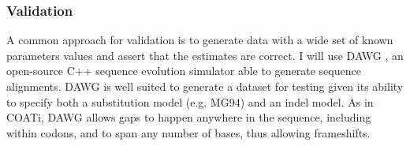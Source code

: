 



\subsubsection{Validation}

A common approach for validation is to generate data with a wide set of known
parameters values and assert that the estimates are correct.
I will use DAWG \parencite{cartwright2005dawg}, an open-source C++ sequence
evolution simulator able to generate sequence alignments.
DAWG is well suited to generate a dataset for testing given its ability to
specify both a substitution model (e.g. MG94) and an indel model.
As in COATi, DAWG allows gaps to happen anywhere in the sequence, including
within codons, and to span any number of bases, thus allowing frameshifts.



